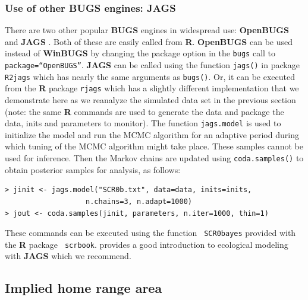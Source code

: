 \subsubsection{Use of other \textbf{BUGS} engines: {\bf JAGS}}

There are two other popular {\bf BUGS} engines in widespread use: {\bf
  OpenBUGS} \citep{thomas_etal:2006} and {\bf JAGS}
\citep{plummer:2003}. Both of these are easily called from {\bf
  R}. {\bf OpenBUGS} can be used instead of {\bf WinBUGS} by changing
the package option in the \mbox{\tt bugs} call to \mbox{\tt
  package=``OpenBUGS''}.  {\bf JAGS} can be called using the function
\mbox{\tt jags()} in package \mbox{\tt R2jags} which has nearly the
same arguments as \mbox{\tt bugs()}.  Or, it can be executed from
the {\bf R}
package
 \mbox{\tt rjags} \citep{plummer:2011} which has a slightly
different implementation that we demonstrate here as we reanalyze the
simulated data set in the previous section (note: the same {\bf R}
commands are used to generate the data and package the data, inits and
parameters to monitor). The function \mbox{\tt jags.model} is used to
initialize the model and run the MCMC algorithm for an adaptive period
during which tuning of the MCMC algorithm might take place.  These
samples cannot be used for inference.  Then the Markov chains are
updated using \mbox{\tt coda.samples()} to obtain posterior samples
for analysis, as follows:
{\small
\begin{verbatim}
> jinit <- jags.model("SCR0b.txt", data=data, inits=inits,
                   n.chains=3, n.adapt=1000)
> jout <- coda.samples(jinit, parameters, n.iter=1000, thin=1)
\end{verbatim}
} 
These commands can be executed using the function \mbox{\tt
  SCR0bayes} provided with the {\bf R} package \mbox{\tt
  scrbook}. \citet{hobbs:2011} provides a good introduction to
ecological modeling with {\bf JAGS} which we recommend.


\subsection{Implied home range area}

